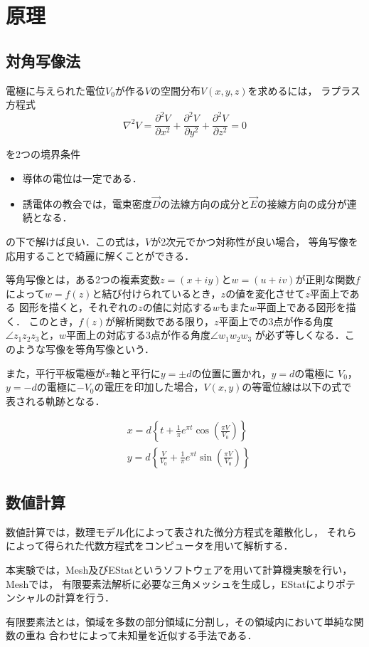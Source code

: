 
\section{原理}

\subsection{対角写像法}
電極に与えられた電位$V_0$が作る$V$の空間分布$V(x,y,z)$を求めるには，
ラプラス方程式
$$
\nabla^2 V=\frac{\partial^2 V}{\partial x^2}+\frac{\partial^2 V}{\partial y^2}+\frac{\partial^2 V}{\partial z^2}=0
$$

を2つの境界条件

\begin{itemize}
    \item 導体の電位は一定である．
    \item 誘電体の教会では，電束密度$\vec{D}$の法線方向の成分と$\vec{E}$の接線方向の成分が連続となる．
\end{itemize}

の下で解けば良い．この式は，$V$が2次元でかつ対称性が良い場合，
等角写像を応用することで綺麗に解くことができる．

等角写像とは，ある2つの複素変数$z= (x + iy)とw = (u + iv)$が正則な関数$f$
によって$w =f(z)$と結び付けられているとき，$z$の値を変化させて$z$平面上である
図形を描くと，それぞれの$z$の値に対応する$w$もまた$w$平面上である図形を描く．
このとき，$f(z)$が解析関数である限り，$z$平面上での3点が作る角度
$\angle z_1z_2z_3$と，$w$平面上の対応する3点が作る角度$\angle w_1w_2w_3$
が必ず等しくなる．このような写像を等角写像という．

また，平行平板電極が$x$軸と平行に$y = \pm d$の位置に置かれ，$y = d$の電極に
$V_0$，$y = -d$の電極に$-V_0$の電圧を印加した場合，$V(x,y)$の等電位線は以下の式で
表される軌跡となる．

$$
\begin{aligned}
&x=d\left\{t+\frac{1}{\pi} e^{\pi t} \cos \left(\frac{\pi V}{V_0}\right)\right\} \\
&y=d\left\{\frac{V}{V_0}+\frac{1}{\pi} e^{\pi t} \sin \left(\frac{\pi V}{V_0}\right)\right\}
\end{aligned}
$$

\subsection{数値計算}

数値計算では，数理モデル化によって表された微分方程式を離散化し，
それらによって得られた代数方程式をコンピュータを用いて解析する．

本実験では，Mesh及びEStatというソフトウェアを用いて計算機実験を行い，Meshでは，
有限要素法解析に必要な三角メッシュを生成し，EStatによりポテンシャルの計算を行う．

有限要素法とは，領域を多数の部分領域に分割し，その領域内において単純な関数の重ね
合わせによって未知量を近似する手法である．
